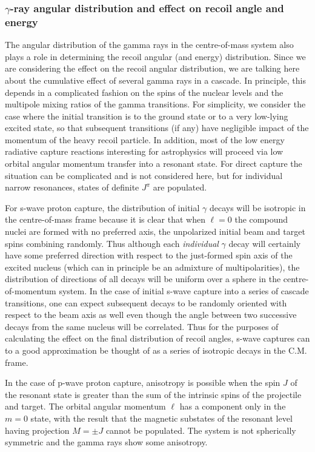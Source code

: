 \subsubsection{$\gamma$-ray angular distribution and effect on recoil angle and energy} 

The angular distribution of the gamma rays in the centre-of-mass system also plays a role in determining the recoil angular (and energy) distribution. Since we are considering the effect on the recoil angular distribution, we are talking here about the cumulative effect of several gamma rays in a cascade. In principle, this depends in a complicated fashion on the spins of the nuclear levels and the multipole mixing ratios of the gamma transitions. For simplicity, we consider the case where the initial transition is to the ground state or to a very low-lying excited state, so that subsequent transitions (if any) have negligible impact of the momentum of the heavy recoil particle. In addition, most of the low energy radiative capture reactions interesting for astrophysics will proceed via low orbital angular momentum transfer into a resonant state. For direct capture the situation can be complicated and is not considered here, but for individual narrow resonances, states of definite $J^{\pi}$ are populated.

For s-wave proton capture, the distribution of initial $\gamma$ decays will be isotropic in the centre-of-mass frame because it is clear that when $\ell=0$ the compound nuclei are formed with no preferred axis, the unpolarized initial beam and target spins combining randomly. Thus although each {\em individual} $\gamma$ decay will certainly have some preferred direction with respect to the just-formed spin axis of the excited nucleus (which can in principle be an admixture of multipolarities), the distribution of directions of all decays will be uniform over a sphere in the centre-of-momentum system. In the case of initial s-wave capture into a series of cascade transitions, one can expect subsequent decays to be randomly oriented with respect to the beam axis as well even though the angle between two successive decays from the same nucleus will be correlated. Thus for the purposes of calculating the effect on the final distribution of recoil angles, s-wave captures can to a good approximation be thought of as a series of isotropic decays in the C.M. frame. 

In the case of p-wave proton capture, anisotropy is possible when the spin $J$ of the resonant state is greater than the sum of the intrinsic spins of the projectile and target. The orbital angular momentum $\ell$ has a component only in the $m=0$ state, with the result that the magnetic substates of the resonant level having projection $M=\pm J$ cannot be populated. The system is not spherically symmetric and the gamma rays show some anisotropy.

